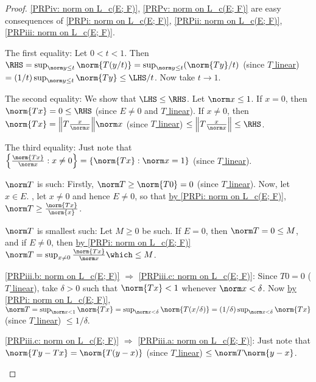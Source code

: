 	\begin{proof}
		\ref{PRPiv: norm on L_c(E; F)},
		\ref{PRPv: norm on L_c(E; F)}
		are easy consequences of
		\ref{PRPi: norm on L_c(E; F)},
		\ref{PRPii: norm on L_c(E; F)},
		\ref{PRPiii: norm on L_c(E; F)}.
		\begin{mylist}
			\item The first equality: Let $0 < t < 1$. Then $\RHS = \sup_{\norm y\le t}\norm{T(y/t)}
			= \sup_{\norm y\le t}(\norm{Ty}/t)$ (since \uline{$T$ linear})
			$ = (1/t)\sup_{\norm y\le t}\norm{Ty}\le \LHS/t$.
			 Now take $t\to 1$.
			
			The second equality: We show that $\LHS\le\RHS$. Let $\norm x\le 1$. If $x = 0$, then $\norm{Tx} = 0\le \RHS$ (since \uline{$E\ne 0$} and \uline{$T$ linear}). If $x\ne 0$, then $\norm{Tx} = \Bigl\| T\frac{x}{\norm x} \Bigr\|\norm x$ (since \uline{$T$ linear}) $\le \Bigl\| T\frac{x}{\norm x} \Bigr\|\le \RHS$.
			
			The third equality: Just note that $\Bigl\{\frac{\norm{Tx}}{\norm x} : x\ne 0\Bigr\} = \{\norm{Tx} : \norm x = 1\}$ (since \uline{$T$ linear}).
			
			
			\item $\norm T$ is such: Firstly, $\norm T\ge \norm{T0} = 0$ (since \uline{$T$ linear}). Now, let $x\in E$. \Wlogg, let $x\ne 0$ and hence $E\ne 0$, so that \uline{by {\ref{PRPi: norm on L_c(E; F)}}}, $\norm T\ge \frac{\norm{Tx}}{\norm{x}}$.
			
			$\norm T$ is smallest such: Let $M\ge 0$ be such. If $E = 0$, then $\norm T = 0\le M$, and if $E\ne 0$, then \uline{by {\ref{PRPi: norm on L_c(E; F)}}} $\norm T = \sup_{x\ne 0}\frac{\norm{Tx}}{\norm x}\which\le M$.
			
			\item \ref{PRPiii.b: norm on L_c(E; F)} $\Rightarrow$ \ref{PRPiii.c: norm on L_c(E; F)}: Since $T0 = 0$ (\uline{$T$ linear}), take $\delta > 0$ such that $\norm{Tx} < 1$ whenever $\norm x < \delta$. Now \uline{by {\ref{PRPi: norm on L_c(E; F)}}}, $\norm T 
			 = \sup_{\norm x < 1}\norm{Tx} 
			 = \sup_{\norm x < \delta}\norm{T(x/\delta)} 
			 = (1/\delta)\sup_{\norm x < \delta}\norm{Tx}$ (since \uline{$T$ linear}) $
			 \le 1/\delta$.
			 
			\ref{PRPiii.c: norm on L_c(E; F)} $\Rightarrow$ \ref{PRPiii.a: norm on L_c(E; F)}: Just note that $\norm{Ty - Tx} 
			 = \norm{T(y - x)}$ (since \uline{$T$ linear}) $
			 \le \norm T\norm{y - x}$.\qedhere
		\end{mylist}
	\end{proof}
	
